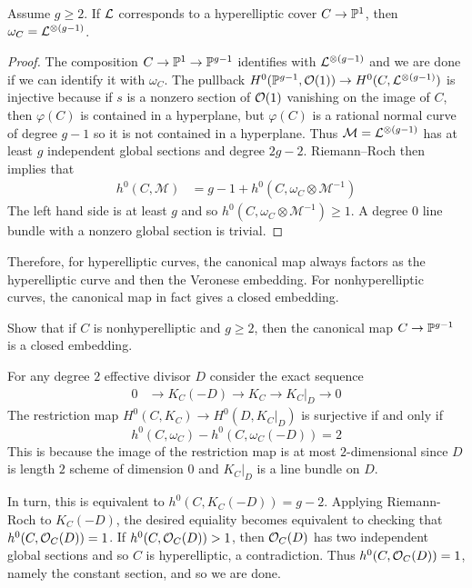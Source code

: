 \documentclass[12pt]{article}
\begin{document}
\begin{proposition}
    Assume $g\geq 2$. If $\cL$ corresponds to a hyperelliptic cover $C \to \P^1$, then $\omega_C = \cL^{\otimes (g-1)}$.
\end{proposition}

\begin{proof}
    The composition $C \to \P^1 \to \P^{g-1}$ identifies with $\cL^{\otimes (g-1)}$ and we are done if we can identify it with $\omega_C$. The pullback $H^0(\P^{g-1},\cO(1)) \to H^0(C, \cL^{\otimes (g-1)})$ is injective because if $s$ is a nonzero section of $\cO(1)$ vanishing on the image of $C$, then $\varphi(C)$ is contained in a hyperplane, but $\varphi(C)$ is a rational normal curve of degree $g-1$ so it is not contained in a hyperplane. Thus $\cM = \cL^{\otimes (g-1)}$ has at least $g$ independent global sections and degree $2g-2$. Riemann--Roch then implies that
    \begin{align*}
        h^0(C,\mathcal M)
& = g-1+h^0(C,\omega_C\otimes \mathcal M^{-1})
    \end{align*} The left hand side is at least $g$ and so $h^0(C,\omega_C\otimes \mathcal M^{-1})\geq 1$. A degree $0$ line bundle with a nonzero global section is trivial. \end{proof}

    Therefore, for hyperelliptic curves, the canonical map always factors as the hyperelliptic curve and then the Veronese embedding. For nonhyperelliptic curves, the canonical map in fact gives a closed embedding. 

    \begin{exercise}
        Show that if $C$ is nonhyperelliptic and $g \geq 2$, then the canonical map $C \to \P^{g-1}$ is a closed embedding.
    \end{exercise}

    \begin{solution}
        For any degree $2$ effective divisor $D$ consider the exact sequence \begin{align*}
            0 & \to K_C(-D) \to K_C \to K_C|_D \to 0
        \end{align*} The restriction map $H^0(C, K_C) \to H^0(D, K_C|_D)$ is surjective if and only if \[h^0(C,\omega_C)-h^0(C,\omega_C(-D))=2\] This is because the image of the restriction map is at most $2$-dimensional since $D$ is length $2$ scheme of dimension $0$ and $K_C\vert_D$ is a line bundle on $D$. 

In turn, this is equivalent to $h^0(C, K_C(-D)) = g-2$. Applying Riemann-Roch to $K_C(-D)$, the desired equiality becomes equivalent to checking that $h^0(C, \cO_C(D)) = 1$. If $h^0(C, \cO_C(D)) > 1$, then $\cO_C(D)$ has two independent global sections and so $C$ is hyperelliptic, a contradiction. Thus $h^0(C, \cO_C(D)) = 1$, namely the constant section, and so we are done.
    \end{solution}
\end{document}
